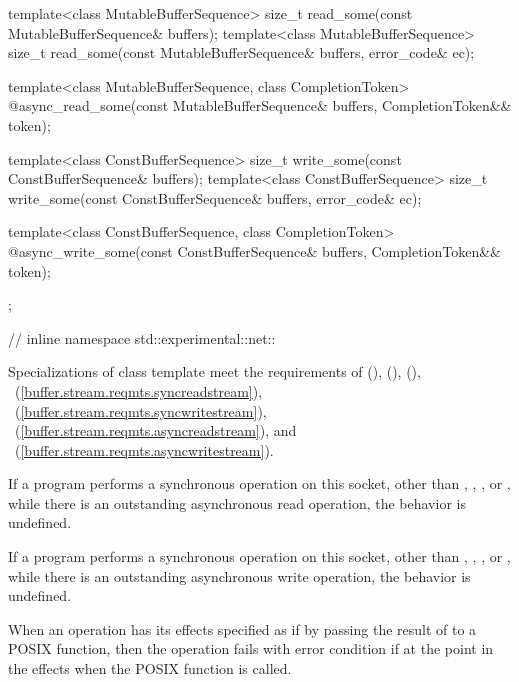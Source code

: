 \begin{codeblock}
{{    template<class MutableBufferSequence>
      size_t read_some(const MutableBufferSequence& buffers);
    template<class MutableBufferSequence>
      size_t read_some(const MutableBufferSequence& buffers,
                       error_code& ec);

    template<class MutableBufferSequence, class CompletionToken>
      @\DEDUCED@ async_read_some(const MutableBufferSequence& buffers,
                              CompletionToken&& token);

    template<class ConstBufferSequence>
      size_t write_some(const ConstBufferSequence& buffers);
    template<class ConstBufferSequence>
      size_t write_some(const ConstBufferSequence& buffers,
                        error_code& ec);

    template<class ConstBufferSequence, class CompletionToken>
      @\DEDUCED@ async_write_some(const ConstBufferSequence& buffers,
                               CompletionToken&& token);
  };

} // inline namespace std::experimental::net::\namespacever
\end{codeblock}

\pnum
Specializations of class template  meet the requirements of  (),  (),  (), ~(\ref{buffer.stream.reqmts.syncreadstream}), ~(\ref{buffer.stream.reqmts.syncwritestream}), ~(\ref{buffer.stream.reqmts.asyncreadstream}), and ~(\ref{buffer.stream.reqmts.asyncwritestream}).

\pnum
If a program performs a synchronous operation on this socket, other than , , , or , while there is an outstanding asynchronous read operation, the behavior is undefined.

\pnum
If a program performs a synchronous operation on this socket, other than , , , or , while there is an outstanding asynchronous write operation, the behavior is undefined.

\pnum
When an operation has its effects specified as if by passing the result of  to a POSIX function, then the operation fails with error condition  if  at the point in the effects when the POSIX function is called.

